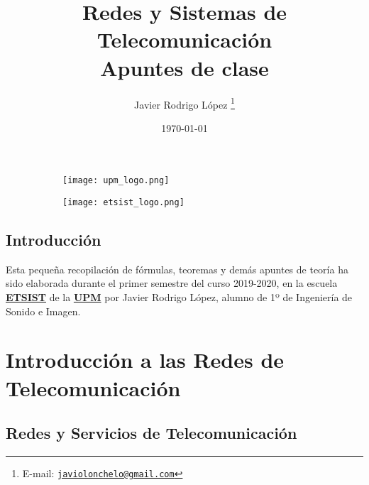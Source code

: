 \documentclass[a4paper]{book}
\title{\Huge Redes y Sistemas de Telecomunicación\\
\Large Apuntes de clase}
\author{Javier Rodrigo López \thanks{E-mail: \href{mailto:javiolonchelo@gmail.com}{\texttt{javiolonchelo@gmail.com}}}}
\date{\today}
\numberwithin{figure}{chapter}
\numberwithin{equation}{subsection}
\begin{document}
\setlength{\wpYoffset}{-1 cm}


\maketitle

\setlength{\parskip}{0.5em}





\begin{figure}[t!]
  \centering
  \begin{subfigure}[b]{0.65\linewidth}
    \texttt{[image: upm\_logo.png]}
  \end{subfigure}
  \begin{subfigure}[b]{0.25\linewidth}
    \texttt{[image: etsist\_logo.png]}
  \end{subfigure}
\end{figure}


\newpage


\section*{Introducción}
Esta pequeña recopilación de fórmulas, teoremas y demás apuntes de teoría ha sido elaborada durante el primer semestre del curso 2019-2020, en la escuela \href{https://www.etsist.upm.es/}{\textbf{ETSIST}} de la \href{http://www.upm.es/}{\textbf{UPM}} por Javier Rodrigo López, alumno de 1º de Ingeniería de Sonido e Imagen.

\newpage

\setlength{\parskip}{0em}
\tableofcontents
\setlength{\parskip}{0.5em}

\chapter{Introducción a las Redes de Telecomunicación}

\section{Redes y Servicios de Telecomunicación}
\end{document}
